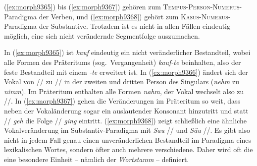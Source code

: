 \begin{exe}
  \ex \label{ex:morph9365}
  \begin{xlist}
  \end{xlist}
  \ex \label{ex:morph9366}
  \begin{xlist}
  \end{xlist}
  \ex \label{ex:morph9367}
  \begin{xlist}
  \end{xlist}
  \ex \label{ex:morph9368}
  \begin{xlist}
  \end{xlist}
\end{exe}

(\ref{ex:morph9365}) bis (\ref{ex:morph9367}) gehören zum \textsc{Tempus}-\textsc{Person}-\textsc{Numerus}-Paradigma der Verben, und (\ref{ex:morph9368}) gehört zum \textsc{Kasus}-\textsc{Numerus}-Paradigma der Substantive.
Trotzdem ist es nicht in allen Fällen eindeutig möglich, eine sich nicht verändernde Segmentfolge auszumachen.

In (\ref{ex:morph9365}) ist \textit{kauf} eindeutig ein nicht veränderlicher Bestandteil, wobei alle Formen des Präteritums (sog.\ Vergangenheit) \textit{kauf-te} beinhalten, also der feste Bestandteil mit einem \textit{-te} erweitert ist.
In (\ref{ex:morph9366}) ändert sich der Vokal von // zu // in der zweiten und dritten Person des Singulars (\textit{nehm} zu \textit{nimm}).
Im Präteritum enthalten alle Formen \textit{nahm}, der Vokal wechselt also zu //.
In (\ref{ex:morph9367}) gehen die Veränderungen im Präteritum so weit, dass neben der Vokaländerung sogar ein auslautender Konsonant hinzutritt und statt // \textit{geh} die Folge // \textit{ging} eintritt.
(\ref{ex:morph9368}) zeigt schließlich eine ähnliche Vokalveränderung im Substantiv-Paradigma mit \textit{Sau} // und \textit{Säu} //.
Es gibt also nicht in jedem Fall genau einen unveränderlichen Bestandteil im Paradigma eines lexikalischen Wortes, sondern öfter auch mehrere verschiedene.
Daher wird oft die eine besondere Einheit -- nämlich der \textit{Wortstamm} -- definiert.

